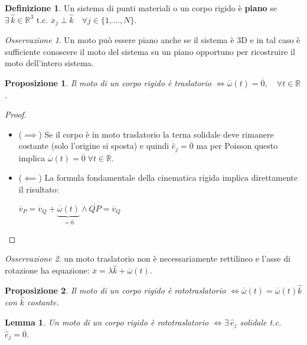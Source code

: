 \documentclass{book}
\theoremstyle{plain}
\theoremstyle{plain}
\newtheorem*{lemma}{Lemma}
\theoremstyle{plain}
\theoremstyle{plain}
\theoremstyle{plain}
\newtheorem{prop}{Proposizione}[chapter]
\theoremstyle{definition}
\newtheorem{defi}{Definizione}[chapter]
\theoremstyle{remark}
\newtheorem*{oss}{Osservazione}
\theoremstyle{definition}
\begin{document}
\begin{defi}
    Un sistema di punti materiali o un corpo rigido è \textbf{piano} se $\exists \, \hat{k} \in \mathbb{R}^{3}$ t.c. $\overline{x}_{j} \perp \hat{k} \quad \forall j \in \{1,\ldots,N\}$.
\end{defi}

\begin{oss}
    Un moto può essere piano anche se il sistema è 3D e in tal caso è sufficiente conoscere il moto del sistema su un piano opportuno per ricostruire il moto dell'intero sistema.
\end{oss}

\begin{prop}
     Il moto di un corpo rigido è traslatorio $\iff \overline{\omega}(t)=\overline{0}, \quad \forall t \in \mathbb{R}$.
\end{prop}

\begin{proof}

    \noindent
    \begin{itemize}
        \item ($\implies$) Se il corpo è in moto traslatorio la terna solidale deve rimanere costante (solo l'origine si sposta) e quindi $\Dot{\hat{e}}_j=\overline{0}$ ma per Poisson questo implica $\overline{\omega}(t)=\overline{0} \;\forall t \in \mathbb{R}$.
        \item ($\impliedby$) La formula fondamentale della cinematica rigida implica direttamente il risultato:
        
        \noindent $\overline{v}_P=\overline{v}_Q+\underbrace{\overline{\omega}(t)}_{=\overline{0}}\wedge\overline{QP}=\overline{v}_Q$
    \end{itemize}
\end{proof}

\begin{oss}
    un moto traslatorio non è necessariamente rettilineo e l'asse di rotazione ha equazione: $\overline{x}=\lambda \hat{k}+\overline{\omega}(t)$.
\end{oss}

\begin{prop}
     Il moto di un corpo rigido è rototraslatorio $\iff \overline{\omega}(t)=\overline{\omega}(t) \hat{k}$ con $\hat{k}$ costante.
\end{prop}

\begin{lemma}
    Un moto di un corpo rigido è rototraslatorio $\iff \exists \, \hat{e}_{j}$ solidale t.c. $\dot{\hat{e}}_{j}=\overline{0}$.
\end{lemma}
\end{document}
